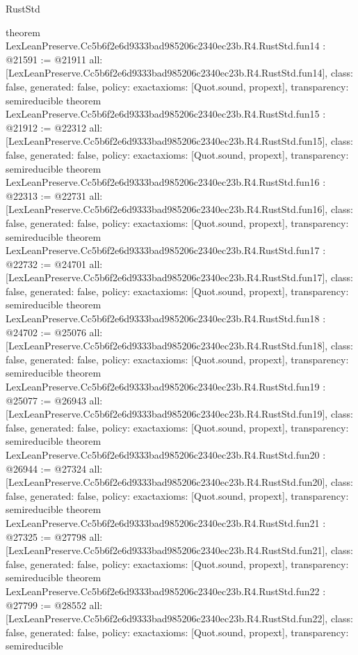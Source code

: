 \begin{lexlean}{RustStd}
\begin{coremodule}
{}
theorem LexLeanPreserve.Cc5b6f2e6d9333bad985206c2340ec23b.R4.RustStd.fun14 : @21591 := @21911 {
  all: [LexLeanPreserve.Cc5b6f2e6d9333bad985206c2340ec23b.R4.RustStd.fun14],
  class: false,
  generated: false,
  policy: exact{axioms: [Quot.sound, propext]},
  transparency: semireducible
}
theorem LexLeanPreserve.Cc5b6f2e6d9333bad985206c2340ec23b.R4.RustStd.fun15 : @21912 := @22312 {
  all: [LexLeanPreserve.Cc5b6f2e6d9333bad985206c2340ec23b.R4.RustStd.fun15],
  class: false,
  generated: false,
  policy: exact{axioms: [Quot.sound, propext]},
  transparency: semireducible
}
theorem LexLeanPreserve.Cc5b6f2e6d9333bad985206c2340ec23b.R4.RustStd.fun16 : @22313 := @22731 {
  all: [LexLeanPreserve.Cc5b6f2e6d9333bad985206c2340ec23b.R4.RustStd.fun16],
  class: false,
  generated: false,
  policy: exact{axioms: [Quot.sound, propext]},
  transparency: semireducible
}
theorem LexLeanPreserve.Cc5b6f2e6d9333bad985206c2340ec23b.R4.RustStd.fun17 : @22732 := @24701 {
  all: [LexLeanPreserve.Cc5b6f2e6d9333bad985206c2340ec23b.R4.RustStd.fun17],
  class: false,
  generated: false,
  policy: exact{axioms: [Quot.sound, propext]},
  transparency: semireducible
}
theorem LexLeanPreserve.Cc5b6f2e6d9333bad985206c2340ec23b.R4.RustStd.fun18 : @24702 := @25076 {
  all: [LexLeanPreserve.Cc5b6f2e6d9333bad985206c2340ec23b.R4.RustStd.fun18],
  class: false,
  generated: false,
  policy: exact{axioms: [Quot.sound, propext]},
  transparency: semireducible
}
theorem LexLeanPreserve.Cc5b6f2e6d9333bad985206c2340ec23b.R4.RustStd.fun19 : @25077 := @26943 {
  all: [LexLeanPreserve.Cc5b6f2e6d9333bad985206c2340ec23b.R4.RustStd.fun19],
  class: false,
  generated: false,
  policy: exact{axioms: [Quot.sound, propext]},
  transparency: semireducible
}
theorem LexLeanPreserve.Cc5b6f2e6d9333bad985206c2340ec23b.R4.RustStd.fun20 : @26944 := @27324 {
  all: [LexLeanPreserve.Cc5b6f2e6d9333bad985206c2340ec23b.R4.RustStd.fun20],
  class: false,
  generated: false,
  policy: exact{axioms: [Quot.sound, propext]},
  transparency: semireducible
}
theorem LexLeanPreserve.Cc5b6f2e6d9333bad985206c2340ec23b.R4.RustStd.fun21 : @27325 := @27798 {
  all: [LexLeanPreserve.Cc5b6f2e6d9333bad985206c2340ec23b.R4.RustStd.fun21],
  class: false,
  generated: false,
  policy: exact{axioms: [Quot.sound, propext]},
  transparency: semireducible
}
theorem LexLeanPreserve.Cc5b6f2e6d9333bad985206c2340ec23b.R4.RustStd.fun22 : @27799 := @28552 {
  all: [LexLeanPreserve.Cc5b6f2e6d9333bad985206c2340ec23b.R4.RustStd.fun22],
  class: false,
  generated: false,
  policy: exact{axioms: [Quot.sound, propext]},
  transparency: semireducible
}
\end{coremodule}
\end{lexlean}
